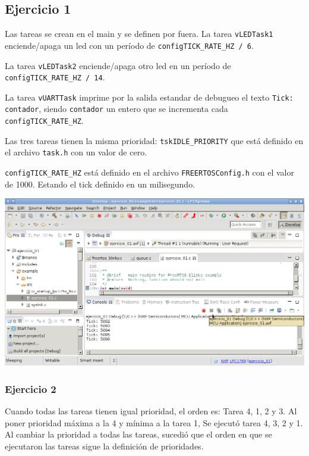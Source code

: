 
\everymath{\displaystyle} %


  
\subsection*{Ejercicio 1}
Las tareas se crean en el main y se definen por fuera. La tarea \verb|vLEDTask1| enciende/apaga un led con un período de \verb|configTICK_RATE_HZ / 6|.

La tarea \verb|vLEDTask2| enciende/apaga otro led en un período de \verb|configTICK_RATE_HZ / 14|.

La tarea \verb|vUARTTask| imprime por la salida estandar de debugueo el texto \verb|Tick: contador|, siendo \verb|contador| un entero que se incrementa cada \verb|configTICK_RATE_HZ|.
 
Las tres tareas tienen la misma prioridad: \verb|tskIDLE_PRIORITY| que está definido en el archivo \verb|task.h| con un valor de cero.
 
\verb|configTICK_RATE_HZ| está definido en el archivo \verb|FREERTOSConfig.h| con el valor de 1000. Estando el tick definido en un milisegundo. 

\vspace{0.3cm}
\includegraphics[scale=0.4]{images/tp_3_1}


\subsubsection*{Ejercicio 2}
Cuando todas las tareas tienen igual prioridad, el orden es: Tarea 4, 1, 2 y 3. Al poner prioridad máxima a la 4 y mínima a la tarea 1, Se ejecutó tarea 4, 3, 2 y 1. Al cambiar la prioridad a todas las tareas, sucedió que el orden en que se ejecutaron las tareas sigue la definición de prioridades. 

